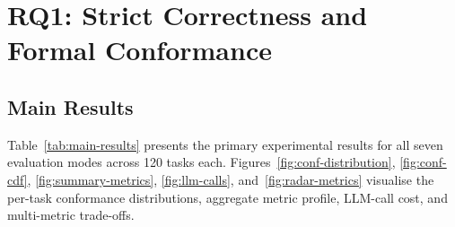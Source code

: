 \section{RQ1: Strict Correctness and Formal Conformance}
\label{sec:exp:rq1}

\subsection{Main Results}

Table~\ref{tab:main-results} presents the primary experimental results for all seven
evaluation modes across 120 tasks each.  Figures~\ref{fig:conf-distribution},
\ref{fig:conf-cdf}, \ref{fig:summary-metrics}, \ref{fig:llm-calls},
and~\ref{fig:radar-metrics} visualise the per-task conformance distributions,
aggregate metric profile, LLM-call cost, and multi-metric trade-offs.

\begin{table}[t]
  \caption{Main comparison results ($n = 120$ tasks per mode). Best formal conformance
    shown in bold. Strict = strict success rate; Conf.\ = formal conformance;
    Kill = mutation kill rate; Fail.\ = mean strict evaluation failures per task
    (out of 64).}
  \label{tab:main-results}
  \centering
\end{table}

